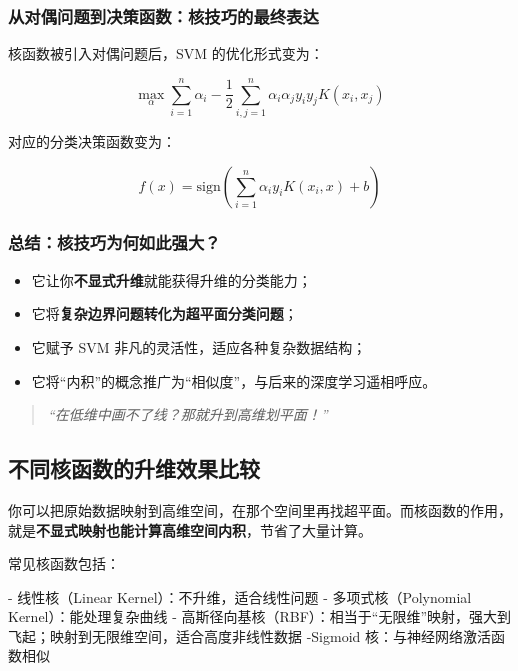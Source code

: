 {\subsubsection{从对偶问题到决策函数：核技巧的最终表达}

核函数被引入对偶问题后，SVM 的优化形式变为：

\begin{equation}
\max_\alpha \sum_{i=1}^n \alpha_i - \frac{1}{2} \sum_{i,j=1}^n \alpha_i \alpha_j y_i y_j K(x_i, x_j)
\end{equation}

对应的分类决策函数变为：

\begin{equation}
\boxed{
    f(x) = \mathrm{sign}\left(\sum_{i=1}^n \alpha_i y_i K(x_i, x) + b\right)
}
\end{equation}

\subsubsection{总结：核技巧为何如此强大？}

\begin{itemize}
    \item 它让你\textbf{不显式升维}就能获得升维的分类能力；
    \item 它将\textbf{复杂边界问题转化为超平面分类问题}；
    \item 它赋予 SVM 非凡的灵活性，适应各种复杂数据结构；
    \item 它将“内积”的概念推广为“相似度”，与后来的深度学习遥相呼应。
\end{itemize}

\begin{quote}
\itshape
“在低维中画不了线？那就升到高维划平面！”
\end{quote}


\subsection{不同核函数的升维效果比较}
你可以把原始数据映射到高维空间，在那个空间里再找超平面。而核函数的作用，就是{\bf 不显式映射也能计算高维空间内积}，节省了大量计算。

常见核函数包括：

- 线性核（Linear Kernel）：不升维，适合线性问题
- 多项式核（Polynomial Kernel）：能处理复杂曲线
- 高斯径向基核（RBF）：相当于“无限维”映射，强大到飞起；映射到无限维空间，适合高度非线性数据
-Sigmoid 核：与神经网络激活函数相似

}
